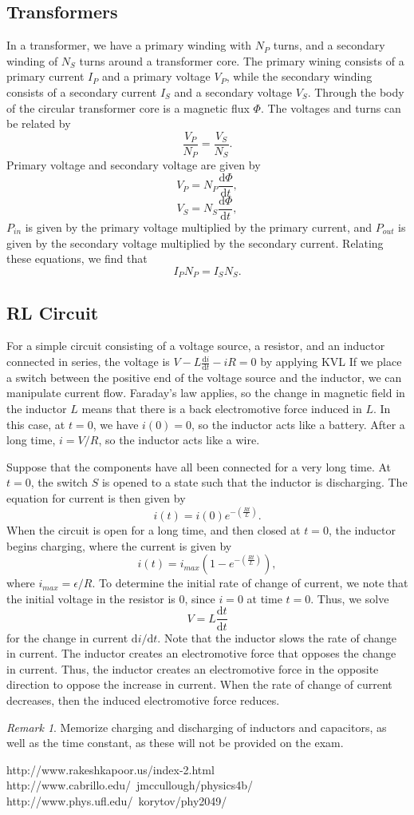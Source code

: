\documentclass[11pt]{article}
\theoremstyle{plain} %
\theoremstyle{definition}
\theoremstyle{example}
\theoremstyle{remark}
\newtheorem*{remark}{Remark}
\begin{document}
\subsection{Transformers}
In a transformer, we have a primary winding with $N_P$ turns, and a secondary winding of $N_S$ turns around a transformer core. The primary wining consists of a primary current $I_P$ and a primary voltage $V_P$, while the secondary winding consists of a secondary current $I_S$ and a secondary voltage $V_S$. Through the body of the circular transformer core is a magnetic flux $\Phi$. The voltages and turns can be related by 
$$\frac{V_P}{N_P} = \frac{V_S}{N_S}.$$
Primary voltage and secondary voltage are given by 
$$V_P = N_P\frac{\mathrm d \Phi}{\mathrm d t},$$
$$V_S = N_S\frac{\mathrm d \Phi}{\mathrm d t},$$
$P_{in}$ is given by the primary voltage multiplied by the primary current, and $P_{out}$ is given by the secondary voltage multiplied by the secondary current. Relating these equations, we find that 
$$I_PN_P = I_SN_S.$$

\subsection{RL Circuit}
For a simple circuit consisting of a voltage source, a resistor, and an inductor connected in series, the voltage is $V-L\frac{\mathrm d i}{\mathrm d t}-iR = 0$ by applying KVL If we place a switch between the positive end of the voltage source and the inductor, we can manipulate current flow. Faraday's law applies, so the change in magnetic field in the inductor $L$ means that there is a back electromotive force induced in $L$. In this case, at $t=0$, we have $i(0) = 0$, so the inductor acts like a battery. After a long time, $i=V/R$, so the inductor acts like a wire. 

Suppose that the components have all been connected for a very long time. At $t=0$, the switch $S$ is opened to a state such that the inductor is discharging. The equation for current is then given by 
$$i(t) = i(0)e^{-\left(\frac{Rt}{L}\right)}.$$
When the circuit is open for a long time, and then closed at $t=0$, the inductor begins charging, where the current is given by 
$$i(t) = i_{max}\left(1-e^{-\left(\frac{Rt}{L}\right)}\right),$$
where $i_{max} = \epsilon/R$. To determine the initial rate of change of current, we note that the initial voltage in the resistor is $0$, since $i=0$ at time $t=0$. Thus, we solve 
$$V = L\frac{\mathrm d t}{\mathrm d t}$$
for the change in current $\mathrm d i/\mathrm d t$. Note that the inductor slows the rate of change in current. The inductor creates an electromotive force that opposes the change in current. Thus, the inductor creates an electromotive force in the opposite direction to oppose the increase in current. When the rate of change of current decreases, then the induced electromotive force reduces. 

\begin{remark}
Memorize charging and discharging of inductors and capacitors, as well as the time constant, as these will not be provided on the exam. 
\end{remark}

http://www.rakeshkapoor.us/index-2.html
http://www.cabrillo.edu/~jmccullough/physics4b/
http://www.phys.ufl.edu/~korytov/phy2049/
\end{document}
